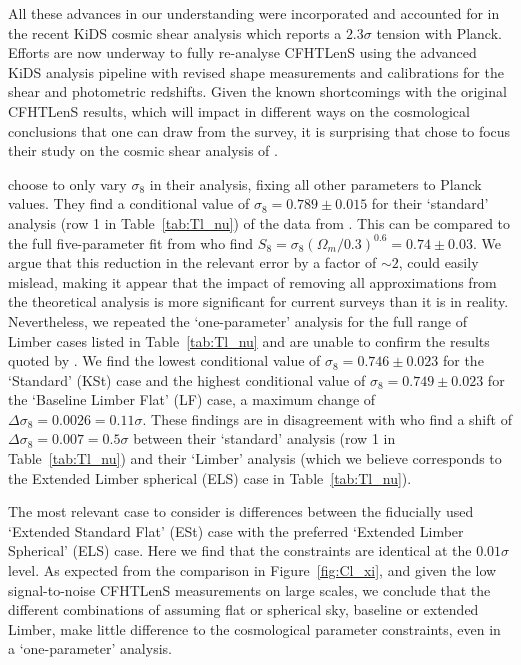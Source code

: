 All these advances in our understanding were incorporated and accounted for in the recent KiDS cosmic shear analysis \citep{hildebrandt/etal:2016} which reports a $2.3 \sigma$ tension with Planck.  Efforts are now underway to fully re-analyse CFHTLenS using the advanced KiDS analysis pipeline with revised shape measurements and calibrations for the shear and photometric redshifts.  Given the known shortcomings with the original CFHTLenS results, which will impact in different ways on the cosmological conclusions that one can draw from the survey, it is surprising that \citet{kitching/etal:2016} chose to focus their study on the cosmic shear analysis of \citet{kilbinger/etal:2013}.  

\citet{kitching/etal:2016} choose to only vary $\sigma_8$ in their analysis, fixing all other parameters to Planck values. They find a conditional value of $\sigma_8 = 0.789 \pm 0.015$ for their `standard' analysis (row 1 in Table~\ref{tab:Tl_nu}) of the data from \citet{kilbinger/etal:2013}. This can be compared to the full five-parameter fit from \citet{kilbinger/etal:2013} who find $S_8=\sigma_8(\Omega_m/0.3)^{0.6} = 0.74 \pm 0.03$.   We argue that this reduction in the relevant error by a factor of $\sim 2$, could easily mislead, making it appear that the impact of removing all approximations from the theoretical analysis is more significant for current surveys than it is in reality.  Nevertheless, we repeated the `one-parameter' analysis for the full range of Limber cases listed in Table~\ref{tab:Tl_nu} and are unable to confirm the results quoted by \citet{kitching/etal:2016}.   We find the lowest conditional value of $\sigma_8 = 0.746 \pm 0.023$ for the `Standard' (KSt) case and the highest conditional value of $\sigma_8 = 0.749 \pm 0.023$ for the `Baseline Limber Flat' (LF) case, a maximum change of $\Delta \sigma_8 = 0.0026 = 0.11 \sigma$.  These findings are in disagreement with \citet{kitching/etal:2016} who find a shift of $\Delta \sigma_8 = 0.007 = 0.5\sigma$ between their `standard' analysis (row 1 in Table~\ref{tab:Tl_nu}) and their `Limber' analysis (which we believe corresponds to the Extended Limber spherical (ELS) case in Table~\ref{tab:Tl_nu}).  

The most relevant case to consider is differences between the fiducially used `Extended Standard Flat' (ESt) case with the preferred `Extended Limber Spherical' (ELS) case.  Here we find that the constraints are identical at the $0.01\sigma$ level.  As expected from the comparison in Figure~\ref{fig:Cl_xi}, and given the low signal-to-noise CFHTLenS measurements on large scales, we conclude that the different combinations of assuming flat or spherical sky, baseline or extended Limber, make little difference to the cosmological parameter constraints, even in a `one-parameter' analysis.    

